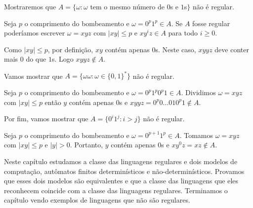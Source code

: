 \begin{example}
  Mostraremos que $A = \{ \omega : \omega$ tem o mesmo número de $0$s e $1$s$\}$ não é regular.

  Seja $p$ o comprimento do bombeamento e $\omega = 0^p 1^p \in A$.
  Se $A$ fosse regular poderíamos escrever $\omega = xyz$ com $|xy| \leq p$ e $x y^i z \in A$ para todo $i \geq 0$.

Como $|xy| \leq p$, por definição, $xy$ contém apenas $0$s.
Neste caso, $xyyz$ deve conter mais $0$ do que $1$s.
Logo $xyyz \notin A$.
\end{example}

\begin{example}
Vamos mostrar que $A = \{\omega \omega : \omega \in \{0,1\}^*\}$ não é regular.

Seja $p$ o comprimento do bombeamento e $\omega = 0^p 1^p 0^p 1 \in A$.
Dividimos $\omega = xyz$ com $|xy| \leq p$ então $y$ contém apenas $0$s e $xyyz = 0^p 0 \dots 0 1 0^p 1 \notin A$.
\end{example}





\begin{example}
  Por fim, vamos mostrar que $A = \{0^i 1^j : i > j \}$ não é regular.

  Seja $p$ o comprimento do bombeamento e $\omega = 0^{p+1} 1^p \in A$.
  Tomamos $\omega = xyz$ com $|xy| \leq p$ e $|y| > 0$.
  Portanto, $y$ contém apenas $0$s e $xy^0z = xz \notin A$.
\end{example}

Neste capítulo estudamos a classe das linguagens regulares e dois modelos de computação, autômatos finitos determinísticos e não-determinísticos.
Provamos que esses dois modelos são equivalentes e que a classe das linguagens que eles reconhecem coincide com a classe das linguagens regulares.
Terminamos o capítulo vendo exemplos de linguagens que não são regulares.

